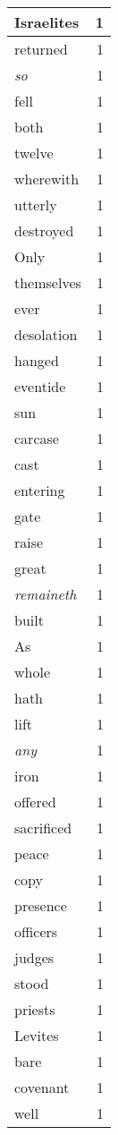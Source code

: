 \begin{center}
\begin{longtable}{l|r}
Israelites & 1\\ \hline 
returned & 1\\ \hline 
\emph{so} & 1\\ \hline 
fell & 1\\ \hline 
both & 1\\ \hline 
twelve & 1\\ \hline 
wherewith & 1\\ \hline 
utterly & 1\\ \hline 
destroyed & 1\\ \hline 
Only & 1\\ \hline 
themselves & 1\\ \hline 
ever & 1\\ \hline 
desolation & 1\\ \hline 
hanged & 1\\ \hline 
eventide & 1\\ \hline 
sun & 1\\ \hline 
carcase & 1\\ \hline 
cast & 1\\ \hline 
entering & 1\\ \hline 
gate & 1\\ \hline 
raise & 1\\ \hline 
great & 1\\ \hline 
\emph{remaineth} & 1\\ \hline 
built & 1\\ \hline 
As & 1\\ \hline 
whole & 1\\ \hline 
hath & 1\\ \hline 
lift & 1\\ \hline 
\emph{any} & 1\\ \hline 
iron & 1\\ \hline 
offered & 1\\ \hline 
sacrificed & 1\\ \hline 
peace & 1\\ \hline 
copy & 1\\ \hline 
presence & 1\\ \hline 
officers & 1\\ \hline 
judges & 1\\ \hline 
stood & 1\\ \hline 
priests & 1\\ \hline 
Levites & 1\\ \hline 
bare & 1\\ \hline 
covenant & 1\\ \hline 
well & 1\\ \hline 

\end{longtable}
\end{center}
